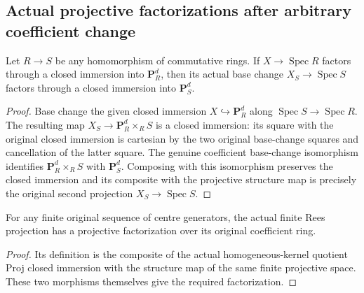 \subsection{Actual projective factorizations after arbitrary coefficient change}

\begin{lemma}
\label{lem:fc-projective-factorization-coefficient-base-change}
\leanok
{}
Let $R\to S$ be any homomorphism of commutative rings. If $X\to\operatorname{Spec}R$
factors through a closed immersion into $\mathbf P_R^d$, then its actual
base change $X_S\to\operatorname{Spec}S$ factors through a closed immersion
into $\mathbf P_S^d$.
\end{lemma}
\begin{proof}
Base change the given closed immersion $X\hookrightarrow\mathbf P_R^d$
along $\operatorname{Spec}S\to\operatorname{Spec}R$. The resulting map
$X_S\to\mathbf P_R^d\times_R S$ is a closed immersion: its square with the
original closed immersion is cartesian by the two original base-change
squares and cancellation of the latter square. The genuine coefficient
base-change isomorphism identifies $\mathbf P_R^d\times_R S$ with
$\mathbf P_S^d$. Composing with this isomorphism preserves the closed
immersion and its composite with the projective structure map is precisely
the original second projection $X_S\to\operatorname{Spec}S$.
\end{proof}

\begin{lemma}
\label{lem:fc-finite-rees-projective-factorization}
\leanok
{}
For any finite original sequence of centre generators, the actual finite
Rees projection has a projective factorization over its original coefficient
ring.
\end{lemma}
\begin{proof}
Its definition is the composite of the actual homogeneous-kernel quotient
Proj closed immersion with the structure map of the same finite projective
space. These two morphisms themselves give the required factorization.
\end{proof}
